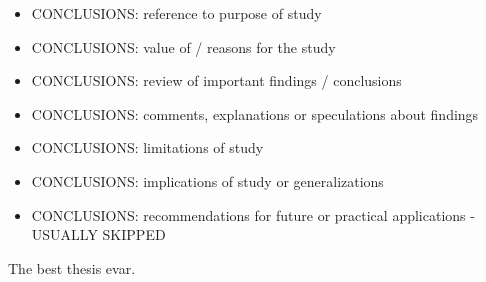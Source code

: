 
\begin{itemize}
\item CONCLUSIONS: reference to purpose of study
\item CONCLUSIONS: value of / reasons for the study
\item CONCLUSIONS: review of important findings / conclusions
\item CONCLUSIONS: comments, explanations or speculations about findings
\item CONCLUSIONS: limitations of study
\item CONCLUSIONS: implications of study or generalizations
\item CONCLUSIONS: recommendations for future or practical applications - USUALLY SKIPPED
\end{itemize}

The best thesis evar.
